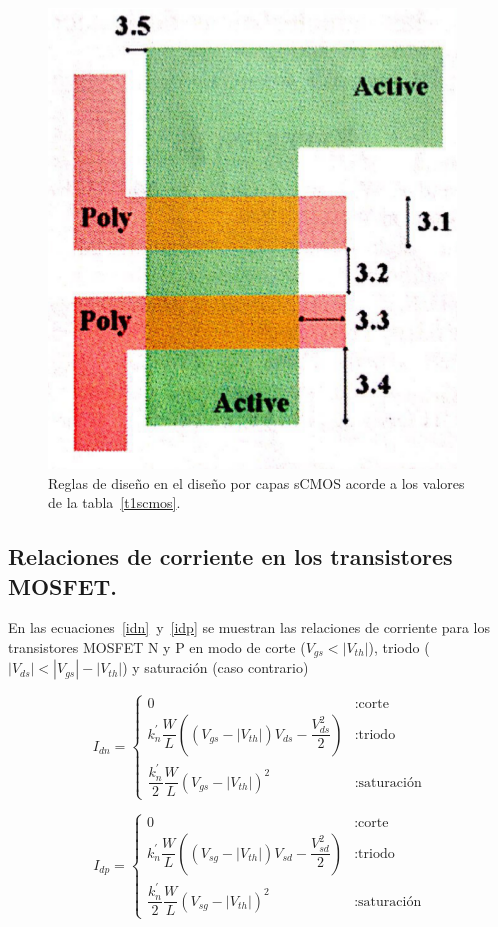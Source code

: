 \documentclass[twocolumn]{IEEEtran}
\begin{document}
\begin{figure}[H]
  \centering
    \includegraphics[scale=0.3]{pics/rules.png}
      \caption{Reglas de diseño en el diseño por capas sCMOS acorde a los valores de la tabla~\ref{t1scmos}.}
	\label{rulespng}
\end{figure}

\subsection{Relaciones de corriente en los transistores MOSFET.}
En las ecuaciones~\ref{idn}~y~\ref{idp} se muestran las relaciones de corriente para los transistores MOSFET N y P en modo de corte ($V_{gs} < |V_{th}|$), triodo ($|V_{ds}|<|V_{gs}|-|V_{th}|$) y saturación (caso contrario)

\footnotesize
\begin{equation}
I_{dn} = \left\{
  \begin{array}{lr}
  	0 & : \text{corte} \\
    k_n^{'}\dfrac{W}{L}\left((V_{gs}-|V_{th}|)V_{ds}-\dfrac{V_{ds}^{2}}{2} \right) & : \text{triodo} \\
    \dfrac{k_n^{'}}{2} \dfrac{W}{L}  \left( V_{gs} - |V_{th}| \right)^2  & : \text{saturación}
  \end{array}
\right.
\label{idn}
\end{equation}

\begin{equation}
I_{dp} = \left\{
  \begin{array}{lr}
  	0 &: \text{corte} \\
    k_n^{'}\dfrac{W}{L}\left((V_{sg}-|V_{th}|)V_{sd}-\dfrac{V_{sd}^{2}}{2} \right) &: \text{triodo} \\
    \dfrac{k_n^{'}}{2} \dfrac{W}{L}  \left( V_{sg} - |V_{th}| \right)^2  &: \text{saturación}
  \end{array}
\right.
\label{idp}
\end{equation}
\end{document}
